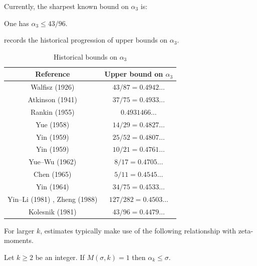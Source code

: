 Currently, the sharpest known bound on $\alpha_3$ is:

\begin{theorem}\label{divisor-kolesnik}\cite{kolesnik} One has $\alpha_3 \leq 43/96$.
\end{theorem}

 records the historical progression of upper bounds on $\alpha_3$.

\begin{table}[ht]
    \def\arraystretch{1.2}
    \centering
    \caption{Historical bounds on $\alpha_3$}
    \begin{tabular}{|c|c|}
    \hline
    Reference & Upper bound on $\alpha_3$\\
    \hline
    Walfisz (1926) \cite{walfisz_uber_1926} & $43/87 = 0.4942\ldots$\\
    \hline
    Atkinson (1941) \cite{atkinson_divisor_1941} & $37/75 = 0.4933\ldots$\\
    \hline
    Rankin (1955) \cite{rankin_van_1955} & $0.4931466\ldots$\\
    \hline
    Yue (1958) \cite{yuh_divisor_1958} & $14/29 = 0.4827\ldots$\\
    \hline
    Yin (1959) \cite{Yin_divisor_25_52} & $25/52 = 0.4807\ldots$\\
    \hline
    Yin (1959) \cite{Yin_divisor_10_21} & $10/21 = 0.4761\ldots$\\
    \hline
    Yue--Wu (1962) \cite{yuh_wu_divisor_1962} & $8/17 = 0.4705\ldots$\\
    \hline
    Chen (1965) \cite{chen_divisor_1965} & $5/11 = 0.4545\ldots$\\
    \hline
    Yin (1964) \cite{Yin_divisor_34_75} & $34/75 = 0.4533\ldots$\\
    \hline
    Yin--Li (1981) \cite{Yin-Li_divisor_127_282}, Zheng (1988) \cite{Zheng_divisor_127_282} & $127/282 = 0.4503\ldots$\\
    \hline
    Kolesnik (1981) \cite{kolesnik} & $43/96 = 0.4479\ldots$\\
    \hline
    \end{tabular}
\label{div-alpha3-table}
\end{table}


For larger $k$, estimates typically make use of the following relationship with zeta-moments.

\begin{lemma}\label{mas}  Let $k \geq 2$ be an integer. If $M(\sigma,k) = 1$ then $\alpha_k \leq \sigma$.
\end{lemma}

